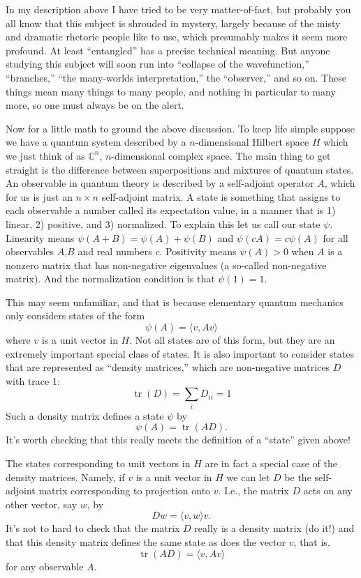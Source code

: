 \documentclass[12pt]{article}
\begin{document}
In my description above I have tried to be very matter-of-fact, but
probably you all know that this subject is shrouded in mystery, largely
because of the misty and dramatic rhetoric people like to use, which
presumably makes it seem more profound. At least ``entangled'' has a
precise technical meaning. But anyone studying this subject will soon
run into ``collapse of the wavefunction,'' ``branches,'' ``the
many-worlds interpretation,'' the ``observer,'' and so on. These things
mean many things to many people, and nothing in particular to many more,
so one must always be on the alert.

Now for a little math to ground the above discussion. To keep life
simple suppose we have a quantum system described by a \(n\)-dimensional
Hilbert space \(H\) which we just think of as \(\mathbb{C}^n\),
\(n\)-dimensional complex space. The main thing to get straight is the
difference between superpositions and mixtures of quantum states. An
observable in quantum theory is described by a self-adjoint operator
\(A\), which for us is just an \(n\times n\) self-adjoint matrix. A
state is something that assigns to each observable a number called its
expectation value, in a manner that is 1) linear, 2) positive, and 3)
normalized. To explain this let us call our state \(\psi\). Linearity
means \(\psi(A + B) = \psi(A) + \psi(B)\) and \(\psi(cA) = c \psi(A)\)
for all observables \(A\),\(B\) and real numbers \(c\). Positivity means
\(\psi(A) > 0\) when \(A\) is a nonzero matrix that has non-negative
eigenvalues (a so-called non-negative matrix). And the normalization
condition is that \(\psi(1) = 1\).

This may seem unfamiliar, and that is because elementary quantum
mechanics only considers states of the form
\[\psi(A) = \langle v, Av\rangle\] where \(v\) is a unit vector in
\(H\). Not all states are of this form, but they are an extremely
important special class of states. It is also important to consider
states that are represented as ``density matrices,'' which are
non-negative matrices \(D\) with trace 1:
\[\operatorname{tr}(D) = \sum_i D_{ii} = 1\] Such a density matrix
defines a state \(\psi\) by \[\psi(A) = \operatorname{tr}(AD).\] It's
worth checking that this really meets the definition of a ``state''
given above!

The states corresponding to unit vectors in \(H\) are in fact a special
case of the density matrices. Namely, if \(v\) is a unit vector in \(H\)
we can let \(D\) be the self-adjoint matrix corresponding to projection
onto \(v\). I.e., the matrix \(D\) acts on any other vector, say \(w\),
by \[Dw = \langle v,w \rangle v.\] It's not to hard to check that the
matrix \(D\) really is a density matrix (do it!) and that this density
matrix defines the same state as does the vector \(v\), that is,
\[\operatorname{tr}(AD) = \langle v, Av\rangle\] for any observable
\(A\).
\end{document}
